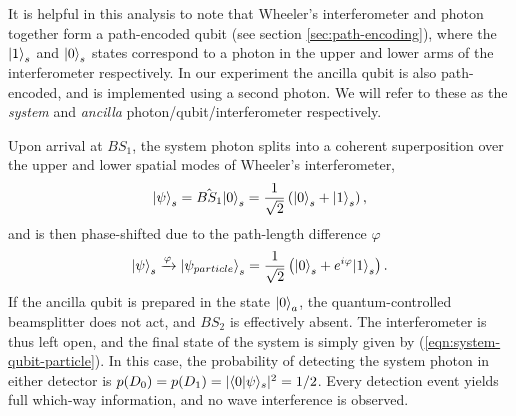 It is helpful in this analysis to note that Wheeler's interferometer and photon together form a path-encoded qubit (see section \ref{sec:path-encoding}), where the $\mbox{$ | 1 \rangle $}_s$ and $\mbox{$ | 0 \rangle $}_s$ states correspond to a photon in the upper and lower arms of the interferometer respectively.  In our experiment the ancilla qubit is also path-encoded, and is implemented using a second photon. We will refer to these as the \emph{system} and \emph{ancilla} photon/qubit/interferometer respectively. 

Upon arrival at $BS_1$, the system photon splits into a coherent superposition over the upper and lower  spatial modes of Wheeler's interferometer, 
\begin{equation}
\mbox{$ | \psi \rangle $}_s = \hat{BS_1}\mbox{$ | 0 \rangle $}_s = \frac{1}{\sqrt{2}}\left(\mbox{$ | 0 \rangle $}_s + \mbox{$ | 1 \rangle $}_s\right),
\end{equation}
and is then phase-shifted due to the path-length difference $\varphi$
\begin{equation}
    \mbox{$ | \psi \rangle $}_s \xrightarrow{\varphi} \mbox{$ | \psi_{particle} \rangle $}_s = \frac{1}{\sqrt{2}}\left(\mbox{$ | 0 \rangle $}_s + e^{i\varphi}\mbox{$ | 1 \rangle $}_s\right).
\label{eqn:system-qubit-particle}
\end{equation}
If the ancilla qubit is prepared in the state $\mbox{$ | 0 \rangle $}_a$, the quantum-controlled beamsplitter does not act, and $BS_2$ is effectively absent. The interferometer is thus left open, and the final state of the system is simply given by (\ref{eqn:system-qubit-particle}). In this case, the probability of detecting the system photon in either detector is $p(D_0) = p(D_1) = |\langle 0 | \psi \rangle_s|^2 = 1/2$. Every detection event yields full which-way information, and no wave interference is observed.

